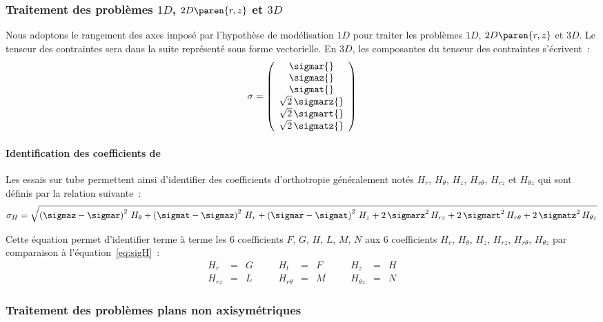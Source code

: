 \subsubsection{Traitement des problèmes $1D$, $2D\paren{r,z}$ et $3D$}
Nous adoptons le rangement des axes imposé par l'hypothèse de
modélisation \(1D\) pour traiter les problèmes \(1D\), \(2D\paren{r,z}\)
et \(3D\). Le tenseur des contraintes sera dans la suite représenté sous
forme vectorielle. En \(3D\), les composantes du tenseur des contraintes
s'écrivent~:
\begin{equation}
  \label{eq:tsigma_tube} \sigma = \left(
  \begin{array}{c}
    \sigmar{} \\
    \sigmaz{} \\
    \sigmat{} \\
    \sqrt{2}\,\sigmarz{} \\
    \sqrt{2}\,\sigmart{} \\
    \sqrt{2}\,\sigmatz{} \\
  \end{array} \right)
\end{equation}

\paragraph{Identification des coefficients de } Les essais sur
tube permettent ainsi d'identifier des coefficients d'orthotropie
généralement notés \(H_{r}\), \(H_{\theta}\), \(H_{z}\),
\(H_{r\theta}\), \(H_{r z}\) et \(H_{\theta z}\) qui sont définis par la
relation suivante~:
\[
\sigmaH = \sqrt{\left(\sigmaz-\sigmar\right)^2\,H_{\theta} +
  \left(\sigmat-\sigmaz\right)^2\,H_{r} +
  \left(\sigmar-\sigmat\right)^2\,H_{z} + 2\,\sigmarz^2\,H_{rz} +
  2\,\sigmart^2\,H_{r\theta} + 2\,\sigmatz^2\,H_{\theta z}}
\]

Cette équation permet d'identifier terme à terme les \(6\)
coefficients \(F\), \(G\), \(H\), \(L\), \(M\), \(N\) aux \(6\)
coefficients \(H_{r}\), \(H_{\theta}\), \(H_{z}\), \(H_{rz}\),
\(H_{r\theta}\), \(H_{\theta z}\) par comparaison à
l'équation~\eqref{eq:sigH}~:
\[
\begin{aligned}
  H_{r}  &= & G & \quad &H_{t}     &= &  F & \quad &H_{z}      &= & H            \\
  H_{rz} &= & L & \quad &H_{r\theta} &= & M & \quad &H_{\theta z} &= &N
\end{aligned}
\]

\subsubsection{Traitement des problèmes plans non axisymétriques}
\label{sec:trait-des-probl}


